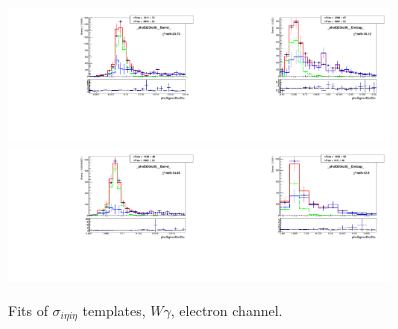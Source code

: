 \begin{figure}[htb]
\begin{center}
   \includegraphics[width=0.45\textwidth]{../figs/figs_v11/ELECTRON_WGamma/TemplateFits/c_TEMPL_SIHIH_UNblind__phoEt25to30__Barrel__RooFit.pdf}\includegraphics[width=0.45\textwidth]{../figs/figs_v11/ELECTRON_WGamma/TemplateFits/c_TEMPL_SIHIH_UNblind__phoEt25to30__Endcap__RooFit.pdf}\\
   \includegraphics[width=0.45\textwidth]{../figs/figs_v11/ELECTRON_WGamma/TemplateFits/c_TEMPL_SIHIH_UNblind__phoEt30to35__Barrel__RooFit.pdf}\includegraphics[width=0.45\textwidth]{../figs/figs_v11/ELECTRON_WGamma/TemplateFits/c_TEMPL_SIHIH_UNblind__phoEt30to35__Endcap__RooFit.pdf}\\
  \label{fig:templateFits_SIHIH_ELECTRON_1}
  \caption{Fits of $\sigma_{i \eta i \eta}$ templates, $W\gamma$, electron channel.}
  \end{center}
\end{figure}


